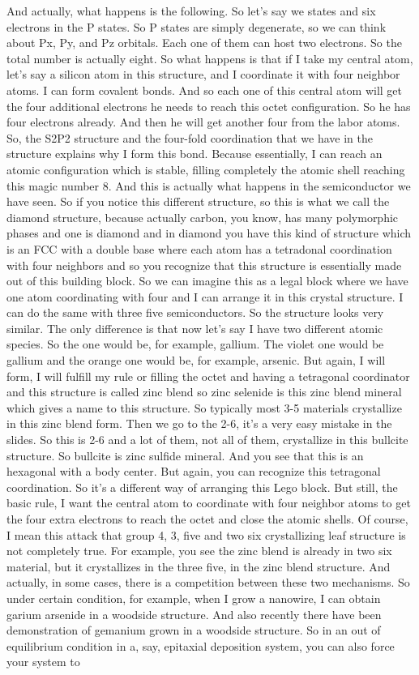 And actually, what happens is the following. So let's say we states and six electrons in the P states. So P states are simply degenerate, so we can think about Px, Py, and Pz orbitals. Each one of them can host two electrons. So the total number is actually eight. So what happens is that if I take my central atom, let's say a silicon atom in this structure, and I coordinate it with four neighbor atoms. I can form covalent bonds. And so each one of this central atom will get the four additional electrons he needs to reach this octet configuration. So he has four electrons already. And then he will get another four from the labor atoms. So, the S2P2 structure and the four-fold coordination that we have in the structure explains why I form this bond. Because essentially, I can reach an atomic configuration which is stable, filling completely the atomic shell reaching this magic number 8. And this is actually what happens in the semiconductor we have seen. So if you notice this different structure, so this is what we call the diamond structure, because actually carbon, you know, has many polymorphic phases and one is diamond and in diamond you have this kind of structure which is an FCC with a double base where each atom has a tetradonal coordination with four neighbors and so you recognize that this structure is essentially made out of this building block. So we can imagine this as a legal block where we have one atom coordinating with four and I can arrange it in this crystal structure. I can do the same with three five semiconductors. So the structure looks very similar. The only difference is that now let's say I have two different atomic species. So the one would be, for example, gallium. The violet one would be gallium and the orange one would be, for example, arsenic. But again, I will form, I will fulfill my rule or filling the octet and having a tetragonal coordinator and this structure is called zinc blend so zinc selenide is this zinc blend mineral which gives a name to this structure. So typically most 3-5 materials crystallize in this zinc blend form. Then we go to the 2-6, it's a very easy mistake in the slides. So this is 2-6 and a lot of them, not all of them, crystallize in this bullcite structure. So bullcite is zinc sulfide mineral. And you see that this is an hexagonal with a body center. But again, you can recognize this tetragonal coordination. So it's a different way of arranging this Lego block. But still, the basic rule, I want the central atom to coordinate with four neighbor atoms to get the four extra electrons to reach the octet and close the atomic shells. Of course, I mean this attack that group 4, 3, five and two six crystallizing leaf structure is not completely true. For example, you see the zinc blend is already in two six material, but it crystallizes in the three five, in the zinc blend structure. And actually, in some cases, there is a competition between these two mechanisms. So under certain condition, for example, when I grow a nanowire, I can obtain garium arsenide in a woodside structure. And also recently there have been demonstration of gemanium grown in a woodside structure. So in an out of equilibrium condition in a, say, epitaxial deposition system, you can also force your system to 